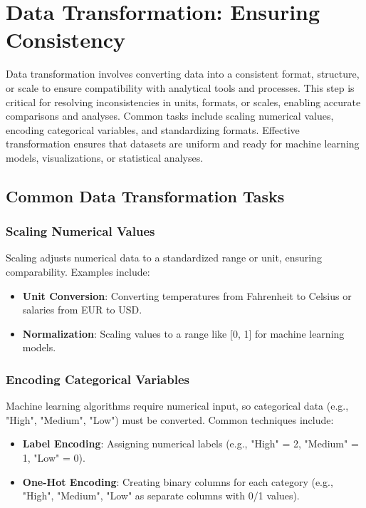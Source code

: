 \documentclass[12pt]{article}
\begin{document}
\section{Data Transformation: Ensuring Consistency}

Data transformation involves converting data into a consistent format, structure, or scale to ensure compatibility with analytical tools and processes. This step is critical for resolving inconsistencies in units, formats, or scales, enabling accurate comparisons and analyses. Common tasks include scaling numerical values, encoding categorical variables, and standardizing formats. Effective transformation ensures that datasets are uniform and ready for machine learning models, visualizations, or statistical analyses.

\subsection{Common Data Transformation Tasks}

\subsubsection{Scaling Numerical Values}
Scaling adjusts numerical data to a standardized range or unit, ensuring comparability. Examples include:
\begin{itemize}
    \item \textbf{Unit Conversion}: Converting temperatures from Fahrenheit to Celsius or salaries from EUR to USD.
    \item \textbf{Normalization}: Scaling values to a range like [0, 1] for machine learning models.
\end{itemize}

\subsubsection{Encoding Categorical Variables}
Machine learning algorithms require numerical input, so categorical data (e.g., "High", "Medium", "Low") must be converted. Common techniques include:
\begin{itemize}
    \item \textbf{Label Encoding}: Assigning numerical labels (e.g., "High" = 2, "Medium" = 1, "Low" = 0).
    \item \textbf{One-Hot Encoding}: Creating binary columns for each category (e.g., "High", "Medium", "Low" as separate columns with 0/1 values).
\end{itemize}
\end{document}

